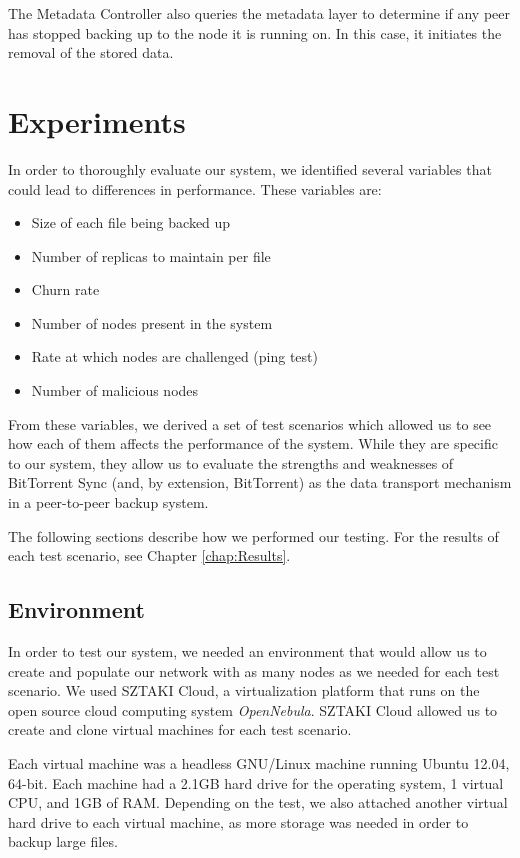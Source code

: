 \documentclass[12pt]{report}
\begin{document}
The Metadata Controller also queries the metadata layer to determine if any peer has stopped backing up to the node it is running on. In this case, it initiates the removal of the stored data.

\chapter{Experiments} \label{chap:Methodology}

In order to thoroughly evaluate our system, we identified several variables that could lead to differences in performance. These variables are:

\begin{itemize}
\item Size of each file being backed up
\item Number of replicas to maintain per file
\item Churn rate
\item Number of nodes present in the system
\item Rate at which nodes are challenged (ping test)
\item Number of malicious nodes
\end{itemize}

From these variables, we derived a set of test scenarios which allowed us to see how each of them affects the performance of the system. While they are specific to our system, they allow us to evaluate the strengths and weaknesses of BitTorrent Sync (and, by extension, BitTorrent) as the data transport mechanism in a peer-to-peer backup system.

The following sections describe how we performed our testing. For the results of each test scenario, see Chapter \ref{chap:Results}.

\section{Environment} \label{sec:Environment_chap:Methodology}

In order to test our system, we needed an environment that would allow us to create and populate our network with as many nodes as we needed for each test scenario. We used SZTAKI Cloud, a virtualization platform that runs on the open source cloud computing system \textit{OpenNebula}. SZTAKI Cloud allowed us to create and clone virtual machines for each test scenario.

Each virtual machine was a headless GNU/Linux machine running Ubuntu 12.04, 64-bit. Each machine had a 2.1GB hard drive for the operating system, 1 virtual CPU, and 1GB of RAM. Depending on the test, we also attached another virtual hard drive to each virtual machine, as more storage was needed in order to backup large files.
\end{document}
